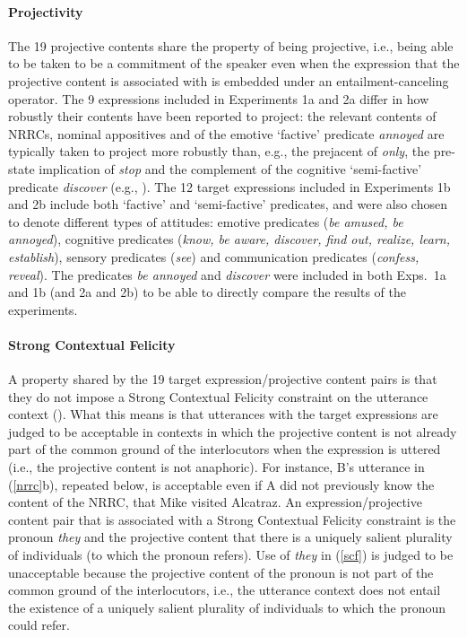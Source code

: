 \documentclass[11pt,fleqn]{article}
\newcommand{\6}{\mbox{$[\hspace*{-.6mm}[$}}
\newcommand{\9}{\mbox{$]\hspace*{-.6mm}]$}}
\begin{document}
\paragraph{Projectivity} The 19 projective contents share the property of being projective, i.e., being able to be taken to be a commitment of the speaker even when the expression that the projective content is associated with is embedded under an entailment-canceling operator. The 9 expressions included in Experiments 1a and 2a differ in how robustly their contents have been reported to project: 
the relevant contents of NRRCs, nominal appositives and of the emotive `factive' predicate {\em annoyed} are typically taken to project more robustly than, e.g., the prejacent of {\em only}, the pre-state implication of {\em stop} and the complement of the cognitive `semi-factive' predicate {\em discover} (e.g., \citealt{karttunen71b,simons01,potts05,abusch10,beaver-belly}). The 12 target expressions included in Experiments 1b and 2b include both `factive' and `semi-factive' predicates, and were also chosen to denote different types of attitudes: emotive predicates ({\em be amused, be annoyed}), cognitive predicates ({\em know, be aware, discover, find out, realize, learn, establish}), sensory predicates ({\em see}) and communication predicates ({\em confess, reveal}). The predicates {\em be annoyed} and {\em discover} were included in both Exps.~1a and 1b (and 2a and 2b) to be able to directly compare the results of the experiments.

\paragraph{Strong Contextual Felicity} A property shared by the 19 target expression/projective content pairs is that they do not impose a Strong Contextual Felicity constraint on the utterance context (\citealt{brst-lang11}). What this means is that utterances with the target expressions are judged to be acceptable in contexts in which the projective content is not already part of the common ground of the interlocutors when the expression is uttered (i.e., the projective content is not anaphoric). For instance, B's utterance in (\ref{nrrc}b), repeated below, is acceptable even if A did not previously know the content of the NRRC, that Mike visited Alcatraz. An expression/projective content pair that is associated with a Strong Contextual Felicity constraint is the pronoun {\em they} and the projective content that there is a uniquely salient plurality of individuals (to which the pronoun refers). Use of {\em they} in (\ref{scf}) is judged to be unacceptable because the projective content of the pronoun is not part of the common ground of the interlocutors, i.e., the utterance context does not entail the existence of a uniquely salient plurality of individuals to which the pronoun could refer. 
\end{document}
